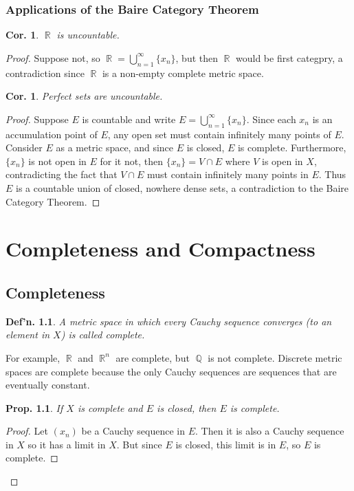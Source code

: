 \documentclass[12pt, a4paper]{book}
\DeclareMathOperator{\Q}{\mathbb{Q}}
\DeclareMathOperator{\R}{\mathbb{R}}
\newtheorem{definition}[theorem]{Def'n.}
\newtheorem{corollary}[theorem]{Cor.}
\newtheorem{proposition}[theorem]{Prop.}
\theoremstyle{nonumberplain}
\newtheorem{proof}{Proof}
\begin{document}
\subsection{Applications of the Baire Category Theorem}
\begin{corollary}
    $\R$ is uncountable.
\end{corollary}
\begin{proof}
    Suppose not, so $\R=\bigcup\limits_{n=1}^\infty\{x_n\}$, but then $\R$ would be first categpry, a contradiction since $\R$ is a non-empty complete metric space.
\begin{corollary}
    Perfect sets are uncountable.
\end{corollary}
\begin{proof}
    Suppose $E$ is countable and write $E=\bigcup\limits_{n=1}^\infty\{x_n\}$.
    Since each $x_n$ is an accumulation point of $E$, any open set must contain infinitely many points of $E$.
    Consider $E$ as a metric space, and since $E$ is closed, $E$ is complete.
    Furthermore, $\{x_n\}$ is not open in $E$ for it not, then $\{x_n\}=V\cap E$ where $V$ is open in $X$, contradicting the fact that $V\cap E$ must contain infinitely many points in $E$.
    Thus $E$ is a countable union of closed, nowhere dense sets, a contradiction to the Baire Category Theorem.
\end{proof}
\chapter{Completeness and Compactness}
\section{Completeness}
\begin{definition}
    A metric space in which every Cauchy sequence converges (to an element in $X$) is called \textit{complete}.
\end{definition}
For example, $\R$ and $\R^n$ are complete, but $\Q$ is not complete. Discrete metric spaces are complete because the
only Cauchy sequences are sequences that are eventually constant.
\begin{proposition}
    If $X$ is complete and $E$ is closed, then $E$ is complete.
\end{proposition}
\begin{proof}
    Let $(x_n)$ be a Cauchy sequence in $E$. Then it is also a Cauchy sequence in $X$ so it has a limit in $X$. But since $E$
    is closed, this limit is in $E$, so $E$ is complete.
\end{proof}

\end{proof}
\end{document}
